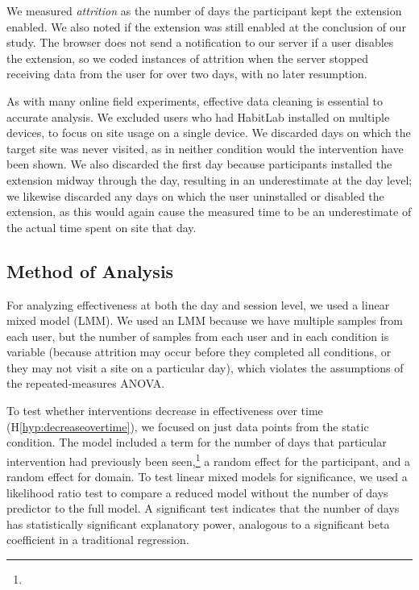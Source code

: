 We measured \textit{attrition} as the number of days the participant kept the extension enabled. We also noted if the extension was still enabled at the conclusion of our study. The browser does not send a notification to our server if a user disables the extension, so we coded instances of attrition when the server stopped receiving data from the user for over two days, with no later resumption.

As with many online field experiments, effective data cleaning is essential to accurate analysis. We excluded users who had HabitLab installed on multiple devices, to focus on site usage on a single device. %
We discarded days on which the target site was never visited, as in neither condition would the intervention have been shown. %
We also discarded the first day because participants installed the extension midway through the day, resulting in an underestimate at the day level; we likewise discarded any days on which the user uninstalled or disabled the extension, as this would again cause the measured time to be an underestimate of the actual time spent on site that day.

\subsection{Method of Analysis}

For analyzing effectiveness at both the day and session level, we used a linear mixed model (LMM). We used an LMM because we have multiple samples from each user, but the number of samples from each user and in each condition is variable (because attrition may occur before they completed all conditions, or they may not visit a site on a particular day), which violates the assumptions of the repeated-measures ANOVA. 


To test whether interventions decrease in effectiveness over time (H\ref*{hyp:decreaseovertime}), we focused on just data points from the static condition. The model included a term for the number of days that particular intervention had previously been seen,\footnote{} a random effect for the participant, and a random effect for domain. To test linear mixed models for significance, we used a likelihood ratio test to compare a reduced model without the number of days predictor to the full model. A significant test indicates that the number of days has statistically significant explanatory power, analogous to a significant beta coefficient in a traditional regression.

